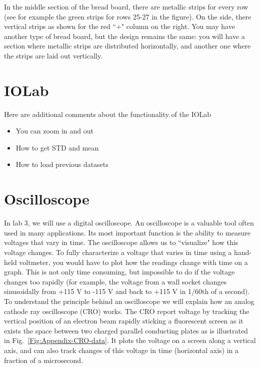 \documentclass[12pt]{report}
\def\cesar#1{{\color{blue}[#1]}}
\begin{document}
\begin{appendix}
In the middle section of the bread board, there are metallic strips for every row (see for example the green strips for rows 25-27 in the figure).
On the side, there vertical strips as shown for the red ``+" column on the right.
You may have another type of bread board, but the design remains the same: you will have a section where metallic strips are distributed horizontally,
and another one where the strips are laid out vertically.



\section{IOLab}
Here are additional comments about the functionality of the IOLab

\begin{itemize}
\item You can zoom in and out
\item How to get STD and mean
\item How to load previous datasets
\end{itemize}

\section{Oscilloscope}
In lab 3, we will use a digital oscilloscope. An oscilloscope is a valuable tool often used in many applications. Its most important function is the
ability to measure voltages that vary in time. The oscilloscope allows us to ``visualize" how this
voltage changes. To fully characterize a voltage that varies in time using a hand-held voltmeter,
you would have to plot how the readings change with time on a graph. This is not only time
consuming, but impossible to do if the voltage changes too rapidly (for example, the voltage
from a wall socket changes sinusoidally from +115 V to -115 V and back to +115 V in 1/60th of
a second). To understand the principle behind an oscilloscope we will explain how an analog cathode ray oscilloscope (CRO) works. The CRO report voltage by tracking the vertical position of an electron beam rapidly
sticking a fluorescent screen as it exists the space between two charged parallel conducting
plates as is illustrated in Fig.~\ref{Fig:Appendix-CRO-data}. It plots the voltage on a screen along a vertical axis, and can
also track changes of this voltage in time (horizontal axis) in a fraction of a microsecond.



\end{appendix}
\end{document}
